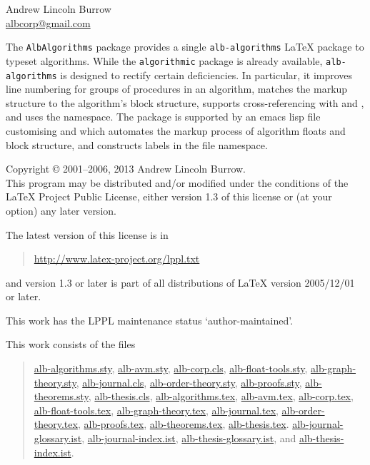 \documentclass[11pt,a4paper,oneside,titlepage]{alb-corp}
\begin{document}


\begin{albTitlePage}


  Andrew Lincoln Burrow\\
  \url{albcorp@gmail.com}



  The \texttt{AlbAlgorithms} package provides a single
  \texttt{alb-algorithms} \LaTeX{} package to typeset algorithms.  While
  the \texttt{algorithmic} package is already available,
  \texttt{alb-algorithms} is designed to rectify certain deficiencies.
  In particular, it improves line numbering for groups of procedures in
  an algorithm, matches the markup structure to the algorithm's block
  structure, supports cross-referencing with \AUCTeX{} and \RefTeX{},
  and uses the \albLogo{} namespace.  The package is supported by an
  emacs lisp file customising \AUCTeX{} and \RefTeX{} which automates
  the markup process of algorithm floats and block structure, and
  constructs labels in the file namespace.



  Copyright \copyright{} 2001--2006, 2013 Andrew Lincoln Burrow.\\
  This program may be distributed and/or modified under the conditions
  of the \LaTeX{} Project Public License, either version 1.3 of this
  license or (at your option) any later version.

  \medskip{}

  The latest version of this license is in
  \begin{quote}
    \url{http://www.latex-project.org/lppl.txt}
  \end{quote}
  and version 1.3 or later is part of all distributions of LaTeX version
  2005/12/01 or later.

  \medskip{}

  This work has the LPPL maintenance status `author-maintained'.

  \medskip{}

  This work consists of the files
  \begin{quote}
    \begin{flushleft}
      \url{alb-algorithms.sty}, \url{alb-avm.sty}, \url{alb-corp.cls},
      \url{alb-float-tools.sty}, \url{alb-graph-theory.sty},
      \url{alb-journal.cls}, \url{alb-order-theory.sty},
      \url{alb-proofs.sty}, \url{alb-theorems.sty},
      \url{alb-thesis.cls}, \url{alb-algorithms.tex}, \url{alb-avm.tex},
      \url{alb-corp.tex}, \url{alb-float-tools.tex},
      \url{alb-graph-theory.tex}, \url{alb-journal.tex},
      \url{alb-order-theory.tex}, \url{alb-proofs.tex},
      \url{alb-theorems.tex}, \url{alb-thesis.tex}.
      \url{alb-journal-glossary.ist}, \url{alb-journal-index.ist},
      \url{alb-thesis-glossary.ist}, and \url{alb-thesis-index.ist}.
    \end{flushleft}
  \end{quote}



\end{albTitlePage}
\end{document}
